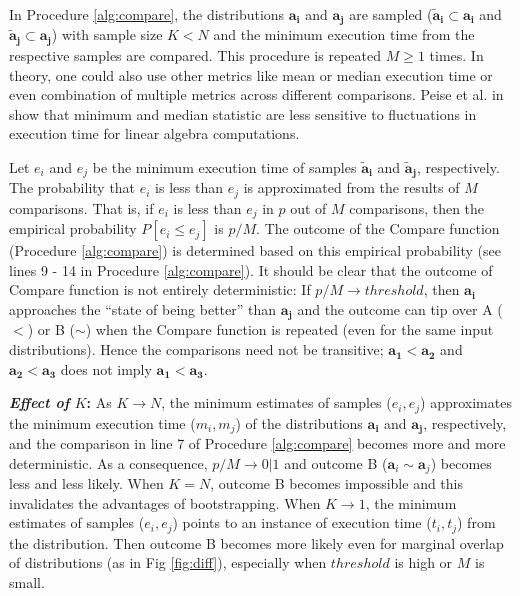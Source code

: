 \documentclass[conference]{IEEEtran}
\newcommand{\p}[1]{{\color{blue} Pdj: #1}}
\begin{document}
In Procedure \ref{alg:compare}, the distributions $\mathbf{a_i}$ and $\mathbf{a_j}$ are sampled ($\mathbf{\tilde{a}_i}
\subset \mathbf{a_i}$ and $\mathbf{\tilde{a}_j} \subset \mathbf{a_j}$) with sample size $K < N$ and the minimum
execution time from the respective samples are compared. This procedure is repeated $M \ge 1$ times.
In theory, one could
also use other metrics like mean or median execution time or even combination of multiple metrics across different
comparisons. Peise et al. in \cite{peisethesis} show that minimum and median statistic are less sensitive to
fluctuations in execution time for linear algebra computations.

Let $e_i$ and $e_j$ be the minimum execution time of samples  $\mathbf{\tilde{a}_i}$ and $\mathbf{\tilde{a}_j}$,
respectively. The probability that $e_i$ is less than $e_j$ is approximated from the results of $M$ comparisons. That
is, if $e_i$ is less than $e_j$ in $p$ out of $M$ comparisons, then the empirical probability $P[e_i \le e_j]$ is
$p/M$. The outcome of the Compare function (Procedure \ref{alg:compare}) is determined based on this empirical
probability (see lines 9 - 14 in Procedure \ref{alg:compare}). It should be clear that the outcome of Compare function is not entirely
deterministic: If $p/M \to threshold$, then  $\mathbf{a_i}$ approaches the ``state of being better'' than $\mathbf{a_j}$ and
the outcome can tip over A ($<$) or B ($\sim$) when the Compare function is repeated (even for the same input distributions). Hence the comparisons need not be transitive;  $\mathbf{a_1} < \mathbf{a_2}$ and
$\mathbf{a_2} < \mathbf{a_3} $ does not imply $\mathbf{a_1} < \mathbf{a_3}$.

\textbf{\textit{Effect of} $K$:} As $K \to N$, the minimum estimates of samples ($e_i, e_j$) approximates the
minimum execution time ($m_i, m_j$) of the distributions $\mathbf{a_i}$ and $\mathbf{a_j}$, respectively, and the
comparison in line 7 of Procedure \ref{alg:compare} becomes more and more deterministic. As a consequence, $p/M \to 0
| 1$ and outcome B
($\mathbf{a}_i \sim \mathbf{a}_j$) becomes less and less likely. When $K=N$,  outcome B becomes impossible and this invalidates the advantages of bootstrapping. When $K \to 1$, the minimum estimates of samples ($e_i, e_j$) points to an instance of execution time ($t_i, t_j$) from the distribution. Then outcome B becomes more likely even for marginal overlap of distributions (as in Fig \ref{fig:diff}), especially when $threshold$ is high or $M$ is small.
\end{document}
